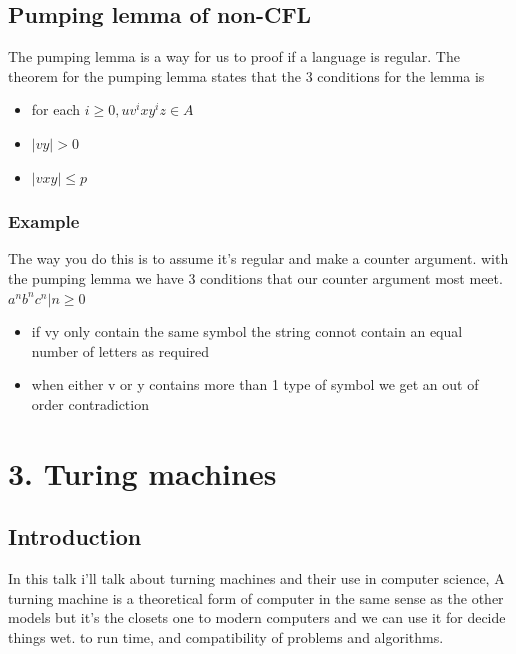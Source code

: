 \documentclass[a4paper,10pt,titlepage]{report}
\begin{document}
\subsection{Pumping lemma of non-CFL}
The pumping lemma is a way for us to proof if a language is regular. The theorem for the pumping lemma states that the 3 conditions for the lemma is\\
\begin{itemize}
\item for each $i \geq 0, uv^ixy^iz \in A $
\item $ |vy| > 0 $
\item $ |vxy| \leq p $
\end{itemize}

\subsubsection{Example}
The way you do this is to assume it's regular and make a counter argument. with the pumping lemma we have 3 conditions that our counter argument most meet.\\

$a^nb^nc^n | n \geq 0$

\begin{itemize}
\item if vy only contain the same symbol the string connot contain an equal number of letters as required
\item when either v or y contains more than 1 type of symbol we get an out of order contradiction
\end{itemize}
\newpage
\section{3. Turing machines}

\subsection{Introduction}
In this talk i'll talk about turning machines and their use in computer science, A turning machine is a theoretical form of computer in the same sense as the other models but it's the closets one to modern computers and we can use it for decide things wet. to run time, and compatibility of problems and algorithms.\\
\end{document}
